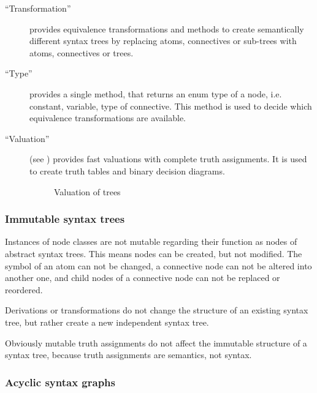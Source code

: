 \begin{description}
\item[“Transformation”]\label{item:TRANSFORMATIONS} provides equivalence transformations 
and methods to create 
 semantically different syntax trees by replacing atoms, connectives or sub-trees with
atoms, connectives or trees.

\item[“Type”] provides a single method, 
that returns an enum type of a node, i.e. constant, variable, type of connective. 
This method is used to decide which equivalence transformations are available.

\item[“Valuation”] (see ) 
provides fast valuations with complete truth assignments. 
It is used to create truth tables and binary decision diagrams. 

\begin{figure}[htbp]
\begin{center}
\caption{Valuation of trees}
\label{fig:NyayaNodeValuation}
\end{center}
\end{figure}

\end{description}
\subsubsection{Immutable syntax trees}

Instances of node classes are not mutable 
regarding their function as nodes of abstract syntax trees. 
This means nodes can be created, but not modified.
The symbol of an atom can not be changed, 
a connective node can not be altered into another one,
and child nodes of a connective node can not be replaced or reordered.

Derivations or transformations do not change the structure of an existing syntax tree,
but rather create a new independent syntax tree.

Obviously mutable truth assignments do not affect the immutable structure of a syntax tree,
because truth assignments are semantics, not syntax. 

\subsubsection{Acyclic syntax graphs}

